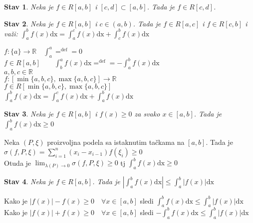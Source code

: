 \documentclass{article}
\newtheorem{stav}{Stav}[section]
\begin{document}
\begin{stavbox}
    \begin{stav}
        Neka je $f\in R[a, b]$ i $[c, d] \subset [a, b]$. Tada je $f\in R[c,d]$.
    \end{stav}
\end{stavbox}
\begin{stavbox}
    \begin{stav}
        Neka je $f \in R[a, b]$ i $c \in (a, b)$. Tada je $f \in R[a, c]$ i $f\in R[c, b]$ i važi: $\displaystyle \int^b_a f(x)\text{dx} = \int^c_a f(x)\text{dx} + \int^b_c f(x)\text{dx}$
    \end{stav}
\end{stavbox}
$f:\{a\} \longrightarrow \mathbb{R}\quad\displaystyle\int^a_a =^{\text{def}}= 0$\\
$f \in R[a, b]\quad\displaystyle\quad\int^a_b f(x)\text{dx} =^{\text{def}}= -\int^b_a f(x)\text{dx}$\\
$a, b, c \in \mathbb{R}$\\
$f:[\min\{a, b, c\}, \max\{a, b, c\}] \longrightarrow \mathbb{R}$\\
$f\in R[\min\{a, b, c\}, \max\{a, b, c\}]$\\
$\displaystyle \int^b_a f(x)\text{dx} = \int^c_a f(x)\text{dx} + \int^b_a f(x) \text{dx}$
\begin{stavbox}
    \begin{stav}
        Neka je $f \in R[a,b]$ i $f(x) \geq 0$ za svako $x \in [a,b]$. Tada je $\displaystyle \int^b_a f(x)\text{dx} \geq 0$
    \end{stav}
\end{stavbox}
Neka $(P, \xi)$ proizvoljna podela sa istaknutim tačkama na $[a, b]$. Tada je $\sigma(f, P, \xi) = \displaystyle \sum^n_{i=1}(x_i - x_{i-1})f(\xi_i) \geq 0$\\
Otuda je $\displaystyle \lim_{\lambda(P)\longrightarrow 0} \sigma (f, P, \xi) \geq 0$ tj $\displaystyle \int^b_a f(x)\text{dx} \geq 0$
\begin{stavbox}
    \begin{stav}
        Neka je $f \in R[a, b]$. Tada je $\displaystyle |\int^b_a f(x)\text{dx}| \leq \int^b_a|f(x)|\text{dx}$
    \end{stav}
\end{stavbox}
Kako je $|f(x)| - f(x) \geq 0 \quad\forall x\in [a, b]$ sledi $\displaystyle \int^b_a f(x)\text{dx} \leq \int^b_a |f(x)|\text{dx}$\\
Kako je $|f(x)| + f(x) \geq 0 \quad\forall x\in [a, b]$ sledi $\displaystyle -\int^b_a f(x)\text{dx} \leq \int^b_a |f(x)|\text{dx}$
\end{document}
